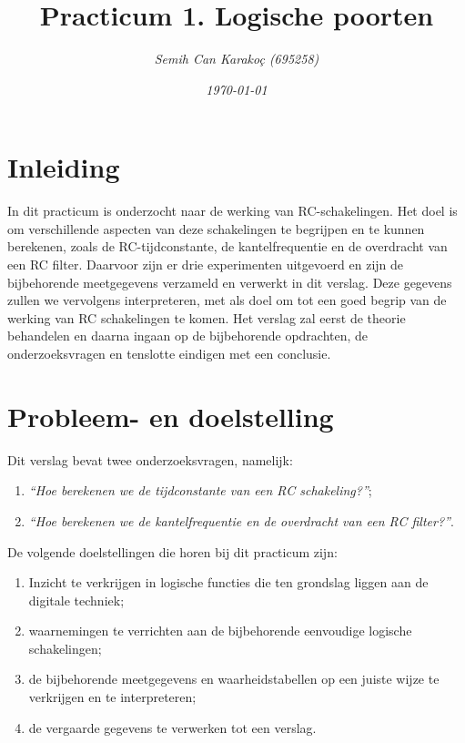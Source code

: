 \documentclass[12pt]{article}
\title{\textbf{Practicum 1. Logische poorten}}
\author{\textit{Semih Can Karakoç (695258)}}
\date{\textit{\today}}
\begin{document}
\clearpage\maketitle    %
\thispagestyle{empty}  %
\begin{figure}[h]
    \centering
\end{figure}
\pagebreak

\tableofcontents    %
\pagebreak

\section{Inleiding}
In dit practicum is onderzocht naar de werking van RC-schakelingen. 
Het doel is om verschillende aspecten van deze schakelingen te begrijpen en te kunnen berekenen, zoals de RC-tijdconstante, de kantelfrequentie en de overdracht van een RC filter.
Daarvoor zijn er drie experimenten uitgevoerd en zijn de bijbehorende meetgegevens verzameld en verwerkt in dit verslag. 
Deze gegevens zullen we vervolgens interpreteren, met als doel om tot een goed begrip van de werking van RC schakelingen te komen. 
Het verslag zal eerst de theorie behandelen en daarna ingaan op de bijbehorende opdrachten, de onderzoeksvragen en tenslotte eindigen met een conclusie.
\pagebreak
\section{Probleem- en doelstelling}
Dit verslag bevat twee onderzoeksvragen, namelijk:
\begin{enumerate}
    \item \textit{``Hoe berekenen we de tijdconstante van een RC schakeling?''};
    \item \textit{``Hoe berekenen we de kantelfrequentie en de overdracht van een RC filter?''}. 
\end{enumerate}
\vspace{0,5cm}
De volgende doelstellingen die horen bij dit practicum zijn:
\begin{enumerate}
    \item Inzicht te verkrijgen in logische functies die ten grondslag liggen aan de digitale techniek;
    \item waarnemingen te verrichten aan de bijbehorende eenvoudige logische schakelingen;
    \item de bijbehorende meetgegevens en waarheidstabellen op een juiste wijze te verkrijgen en te interpreteren;
    \item de vergaarde gegevens te verwerken tot een verslag.
\end{enumerate}
\end{document}
